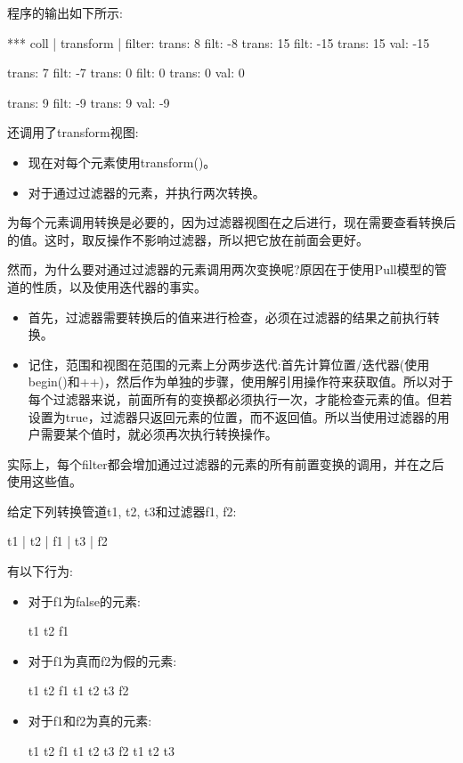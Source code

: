 程序的输出如下所示:

\begin{shell}
*** coll | transform | filter:
trans: 8
filt: -8
trans: 15
filt: -15
trans: 15
val: -15

trans: 7
filt: -7
trans: 0
filt: 0
trans: 0
val: 0

trans: 9
filt: -9
trans: 9
val: -9
\end{shell}

还调用了transform视图:

\begin{itemize}
\item
现在对每个元素使用transform()。

\item
对于通过过滤器的元素，并执行两次转换。
\end{itemize}

为每个元素调用转换是必要的，因为过滤器视图在之后进行，现在需要查看转换后的值。这时，取反操作不影响过滤器，所以把它放在前面会更好。

然而，为什么要对通过过滤器的元素调用两次变换呢?原因在于使用Pull模型的管道的性质，以及使用迭代器的事实。

\begin{itemize}
\item
首先，过滤器需要转换后的值来进行检查，必须在过滤器的结果之前执行转换。
	
\item
记住，范围和视图在范围的元素上分两步迭代:首先计算位置/迭代器(使用begin()和++)，然后作为单独的步骤，使用解引用操作符来获取值。所以对于每个过滤器来说，前面所有的变换都必须执行一次，才能检查元素的值。但若设置为true，过滤器只返回元素的位置，而不返回值。所以当使用过滤器的用户需要某个值时，就必须再次执行转换操作。
\end{itemize}

实际上，每个filter都会增加通过过滤器的元素的所有前置变换的调用，并在之后使用这些值。

给定下列转换管道t1, t2, t3和过滤器f1, f2:

\begin{cpp}
t1 | t2 | f1 | t3 | f2
\end{cpp}

有以下行为:

\begin{itemize}
\item
对于f1为false的元素:

\begin{cpp}
t1 t2 f1
\end{cpp}

\item
对于f1为真而f2为假的元素:

\begin{cpp}
t1 t2 f1 t1 t2 t3 f2
\end{cpp}

\item
对于f1和f2为真的元素:

\begin{cpp}
t1 t2 f1 t1 t2 t3 f2 t1 t2 t3
\end{cpp}
\end{itemize}

